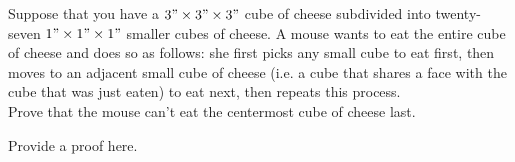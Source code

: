 \documentclass{article}
\renewcommand{\(}{\left(}
\renewcommand{\)}{\right)}
\theoremstyle{plain}
\theoremstyle{plain}
\theoremstyle{definition}
\begin{document}
Suppose that you have a $3" \times 3" \times 3"$ cube of cheese
subdivided into twenty-seven $1" \times 1" \times 1"$
smaller cubes of cheese.
A mouse wants to eat the entire cube of cheese and does so as follows:
she first picks any small cube to eat first,
then moves to an adjacent small cube of cheese
(i.e. a cube that
shares a face with the cube that was just eaten)
to eat next,
then repeats this process. \\

Prove that the mouse can't eat the centermost cube of cheese last.

\begin{shaded}
Provide a proof here.
\end{shaded}
\end{document}
